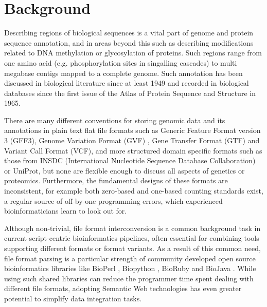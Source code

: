 \section*{Background}
Describing regions of biological sequences is a vital part of genome and protein sequence
annotation, and in areas beyond this such as describing modifications related to DNA methylation
or glycosylation of proteins.
Such regions range from one amino acid (e.g. phosphorylation sites in
singalling cascades) to multi megabase contigs mapped to a complete genome.
Such annotation has been discussed in biological literature since at least 1949\cite{Sanger1949} and recorded in biological databases since the first issue of the Atlas of Protein Sequence and Structure\cite{dayhoff1965atlas} in 1965.

There are many different conventions for storing genomic data and its
annotations in plain text flat file formats such as Generic Feature Format version 3 (GFF3), Genome Variation Format (GVF)
\cite{GVF}, Gene Transfer Format (GTF) and Variant Call Format (VCF), and more structured domain specific formats
such as those from INSDC (International Nucleotide Sequence Database Collaboration) or UniProt, but none are flexible enough to
discuss all aspects of genetics or proteomics.
Furthermore, the fundamental designs of these formats are
inconsistent, for example both zero-based and one-based counting
standards exist, a regular source of off-by-one programming errors,
which experienced bioinformaticians learn to look out for.

Although non-trivial, file format interconversion is a common background task
in current script-centric bioinformatics pipelines, often essential for combining
tools supporting different formats or format variants. 
As a result of this common need, file format parsing is a particular strength of
community developed open source bioinformatics libraries like BioPerl
\cite{BioPerl2002}, Biopython \cite{Biopython2009}, BioRuby \cite{BioRuby2010}
and BioJava \cite{BioJava2012}. While using such shared libraries can reduce the
programmer time spent dealing with different file formats, adopting Semantic
Web technologies has even greater potential to simplify data integration tasks.

